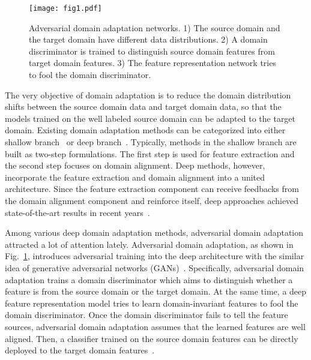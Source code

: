 \documentclass[sigconf]{acmart}
\begin{document}
\begin{figure}[t]
\begin{center}
\texttt{[image: fig1.pdf]}
\end{center}
\vspace{-10pt}
\caption{\small Adversarial domain adaptation networks. 1) The source domain  and the target domain  have different data distributions. 2) A domain discriminator is trained to distinguish source domain features from target domain features. 3) The feature representation network tries to fool the domain discriminator.}
\label{fig:intro}
\vspace{-20pt} 
\end{figure} 

The very objective of domain adaptation is to reduce the domain distribution shifts between the source domain data and target domain data, so that the models trained on the well labeled source domain can be adapted to the target domain. Existing domain adaptation methods can be categorized into either shallow branch~\cite{pan2011domain,gong2012geodesic,li2018transfer,saenko2010adapting,li2019locality} or deep branch~\cite{ganin2016domain,long2018conditional,hoffman2018cycada,bousmalis2017unsupervised}. Typically, methods in the shallow branch are built as two-step formulations. The first step is used for feature extraction and the second step focuses on domain alignment. Deep methods, however, incorporate the feature extraction and domain alignment into a united architecture. Since the feature extraction component can receive feedbacks from the domain alignment component and reinforce itself, deep approaches achieved state-of-the-art results in recent years~\cite{long2018conditional,hoffman2018cycada}.


Among various deep domain adaptation methods, adversarial domain adaptation~\cite{ganin2016domain,tzeng2017adversarial,hong2018conditional,long2018conditional} attracted a lot of attention lately. Adversarial domain adaptation, as shown in Fig.~\ref{fig:intro}, introduces adversarial training into the deep architecture with the similar idea of generative adversarial networks (GANs)~\cite{goodfellow2014generative,mirza2014conditional}. Specifically, adversarial domain adaptation trains a domain discriminator which aims to distinguish whether a feature is from the source domain or the target domain. At the same time, a deep feature representation model tries to learn domain-invariant features to fool the domain discriminator. Once the domain discriminator fails to tell the feature sources, adversarial domain adaptation assumes that the learned features are well aligned. Then, a classifier trained on the source domain features can be directly deployed to the target domain features~\cite{tzeng2017adversarial,sankaranarayanan2018generate}.
\end{document}
